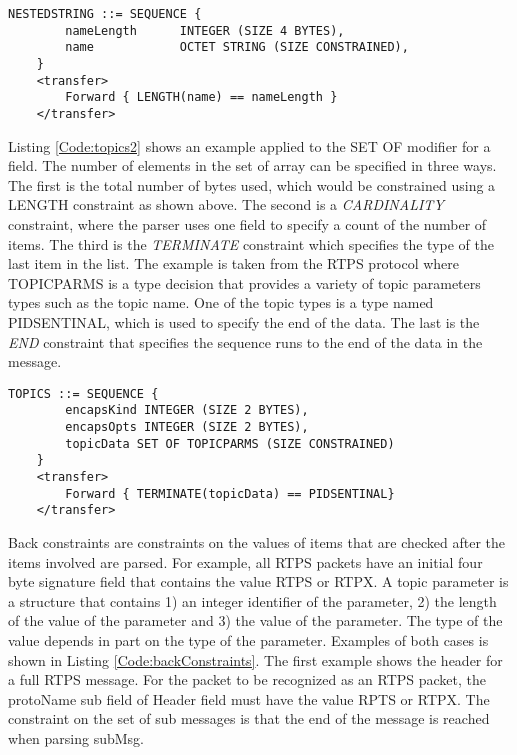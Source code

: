 \documentclass[12pt,oneside,letterpaper]{article}
\begin{document}
\begin{lstlisting}[language=SCL2,style=mystyle,frame=none,float,
caption=Forward Length Constraint,label=Code:nestedstring, xleftmargin=3.5ex]
    NESTEDSTRING ::= SEQUENCE {
        nameLength      INTEGER (SIZE 4 BYTES),
        name            OCTET STRING (SIZE CONSTRAINED),
    }
    <transfer>
        Forward { LENGTH(name) == nameLength }
    </transfer>
\end{lstlisting}

Listing \ref{Code:topics2} shows an example applied to the SET OF modifier for a field. The number of elements in the set of array can be specified in three ways. The first is the total number of bytes used, which would be constrained using a LENGTH constraint as shown above. The second is a \textit{CARDINALITY} constraint, where the parser uses one field to specify a count of the number of items. The third is the \textit{TERMINATE} constraint which specifies the type of the last item in the list. The example is taken from the RTPS protocol where TOPICPARMS is a type decision that provides a variety of topic parameters types such as the topic name. One of the topic types is a type named PIDSENTINAL, which is used to specify the end of the data. The last is the \textit{END} constraint that specifies the sequence runs to the end of the data in the message.

\begin{lstlisting}[language=SCL2,style=mystyle,frame=none,
caption=Forward Terminate Constraint,label=Code:topics2, xleftmargin=3.5ex]
    TOPICS ::= SEQUENCE {
        encapsKind INTEGER (SIZE 2 BYTES),
        encapsOpts INTEGER (SIZE 2 BYTES),
        topicData SET OF TOPICPARMS (SIZE CONSTRAINED)
    }
    <transfer>
        Forward { TERMINATE(topicData) == PIDSENTINAL}
    </transfer>
\end{lstlisting}

Back constraints are constraints on the values of items that are checked after the items involved are parsed. For example, all RTPS packets have an initial four byte signature field that contains the value RTPS or RTPX. A topic parameter is a structure that contains 1) an integer identifier of the parameter, 2) the length of the value of the parameter and 3) the value of the parameter. The type of the value depends in part on the type of the parameter. Examples of both cases is shown in Listing \ref{Code:backConstraints}. The first example shows the header for a full RTPS message. For the packet to be recognized as an RTPS packet, the protoName sub field of Header field must have the value RPTS or RTPX. The constraint on the set of sub messages is that the end of the message is reached when parsing subMsg.
\end{document}
